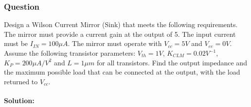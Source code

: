 \subsubsection{Question}
Design a Wilson Current Mirror (Sink) that meets the
following requirements. The mirror must provide a current
gain at the output of 5. The input current must be
$I_{IN} = 100 \mu A$. The mirror must operate with
$V_{cc} = 5V$ and $V_{ee} = 0V$. Assume the following
transistor parameters: $V_{th} = 1V$, $K_{CLM} = 0.02 V^{-1}$,
$K_P = 200 \mu A/V^2$ and
$L = 1 \mu m$ for all transistors. Find the output impedance
and the maximum possible load that can be connected at the
output, with the load returned to $V_{cc}$.
\paragraph{Solution:}
